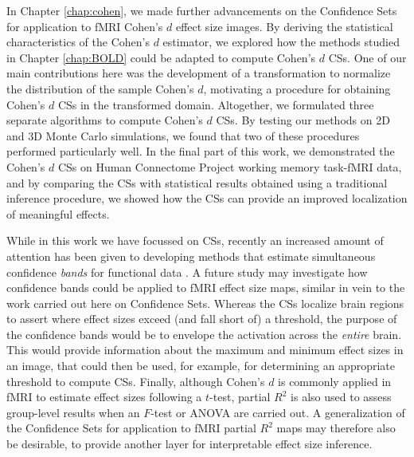 In Chapter \ref{chap:cohen}, we made further advancements on the Confidence Sets for application to fMRI Cohen's $d$ effect size images. By deriving the statistical characteristics of the Cohen's $d$ estimator, we explored how the methods studied in Chapter \ref{chap:BOLD} could be adapted to compute Cohen's $d$ CSs. One of our main contributions here was the development of a transformation to normalize the distribution of the sample Cohen's $d$, motivating a procedure for obtaining Cohen's $d$ CSs in the transformed domain. Altogether, we formulated three separate algorithms to compute Cohen's $d$ CSs. By testing our methods on 2D and 3D Monte Carlo simulations, we found that two of these procedures performed particularly well. In the final part of this work, we demonstrated the Cohen's $d$ CSs on Human Connectome Project working memory task-fMRI data, and by comparing the CSs with statistical results obtained using a traditional inference procedure, we showed how the CSs can provide an improved localization of meaningful effects.

While in this work we have focussed on CSs, recently an increased amount of attention has been given to developing methods that estimate simultaneous confidence \textit{bands} for functional data \citep{Degras2017-sw,Telschow2019-lg}. A future study may investigate how confidence bands could be applied to fMRI effect size maps, similar in vein to the work carried out here on Confidence Sets. Whereas the CSs localize brain regions to assert where effect sizes exceed (and fall short of) a threshold, the purpose of the confidence bands would be to envelope the activation across the \textit{entire} brain. This would provide information about the maximum and minimum effect sizes in an image, that could then be used, for example, for determining an appropriate threshold to compute CSs. Finally, although Cohen's $d$ is commonly applied in fMRI to estimate effect sizes following a $t$-test, partial $R^{2}$ is also used to assess group-level results when an $F$-test or ANOVA are carried out. A generalization of the Confidence Sets for application to fMRI partial $R^{2}$ maps may therefore also be desirable, to provide another layer for interpretable effect size inference.
